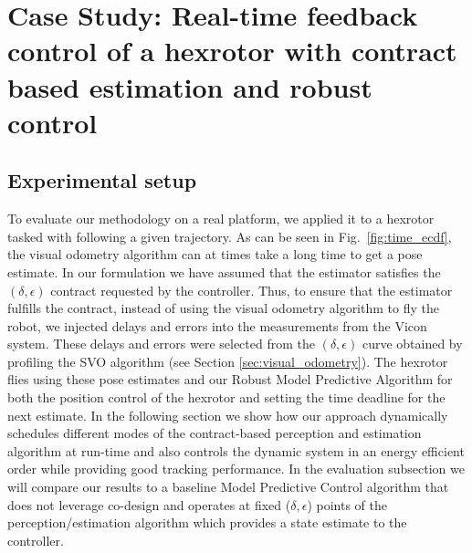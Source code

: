 \section{Case Study: Real-time feedback control of a hexrotor with contract based estimation and robust control}
\label{sec:experiments}

\subsection{Experimental setup}
To evaluate our methodology on a real platform, we applied it to a hexrotor tasked with following a given trajectory.
As can be seen in Fig.~\ref{fig:time_ecdf}, the visual odometry algorithm can at times take a long time to get a pose estimate. In our formulation we have assumed that the estimator satisfies the $(\delta, \epsilon)$ contract requested by the controller. Thus, to ensure that the estimator fulfills the contract, instead of using the visual odometry algorithm to fly the robot, we injected delays and errors into the measurements from the Vicon system. These delays and errors were selected from the $(\delta,\epsilon)$ curve obtained by profiling the SVO algorithm (see Section \ref{sec:visual_odometry}).
The hexrotor flies using these pose estimates and our Robust Model Predictive Algorithm for both the position control of the hexrotor and setting the time deadline for the next estimate.
In the following section we show how our approach dynamically schedules different modes of the contract-based perception and estimation algorithm at run-time and also controls the dynamic system in an energy efficient order while providing good tracking performance. In the evaluation subsection we will compare our results to a baseline Model Predictive Control algorithm that does not leverage co-design and operates at fixed ($\delta,\epsilon$) points of the perception/estimation algorithm which provides a state estimate to the controller.



